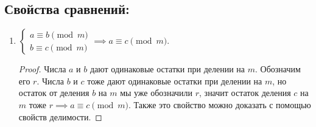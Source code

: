 \documentclass[russian]{lecture-notes}
\begin{document}
\subsection{Свойства сравнений:}
\label{sec:prop}
\begin{enumerate}
	\item 	$\begin{cases}
				a \equiv b \pmod m \\
				b \equiv c \pmod m
			\end{cases} \implies a \equiv c \pmod m$.
			\label{sravn:1}
	\begin{proof}
		Числа $a$ и $b$ дают одинаковые остатки при делении на $m$. Обозначим его $r$. Числа $b$ и $c$ тоже дают одинаковые остатки при делении на $m$, но остаток от деления $b$ на $m$ мы уже обозначили $r$, значит остаток деления $c$ на $m$ тоже $r \implies a \equiv c \pmod m$. Также это свойство можно доказать с помощью свойств делимости.
		

\end{proof}
\end{enumerate}
\end{document}
